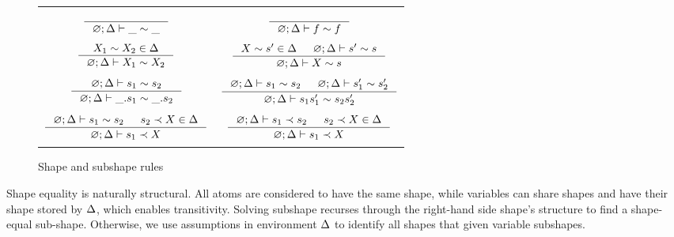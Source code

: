\documentclass[english, mgr]{iithesis}
\newcommand{\solverRule}{\vdash}
\begin{document}
\begin{figure}[htbp]
    \centering
    \begin{tabularx}{\textwidth}{|CC|}
      \hline & \\ $
      \inference{
      }{
        \emptyenv ; \icEnv \solverRule \shatom \csheq \shatom
      }
      $ & $
      \inference{
      }{
        \emptyenv ; \icEnv \solverRule \symb \csheq \symb
      }
      $ \\ & \\
      $
      \inference{
        \termv_1 \csheq \termv_2 \in \icEnv
      }{
        \emptyenv ; \icEnv \solverRule \termv_1 \csheq \termv_2
      }
      $ & $
      \inference{
        \termv  \csheq \shape' \in \icEnv
        &
        \emptyenv ; \icEnv \solverRule \shape'  \csheq \shape
      }{
        \emptyenv ; \icEnv \solverRule \termv  \csheq \shape
      }
      $ \\ & \\
      $\inference{
        \emptyenv ; \icEnv \solverRule \shape_1 \csheq \shape_2
      }{
        \emptyenv ; \icEnv \solverRule \shbind \shape_1 \csheq \shbind \shape_2
      }
      $ & $
      \inference{
        \emptyenv ; \icEnv \solverRule \shape_1 \csheq \shape_2
        &
        \emptyenv ; \icEnv \solverRule \shape_1' \csheq \shape_2'
      }{
        \emptyenv ; \icEnv \solverRule \shape_1 \shape_1' \csheq \shape_2 \shape_2'
      }
      $ \\ & \\ $
      \inference{
        \emptyenv ; \icEnv \solverRule \shape_1 \csheq \shape_2
        &
        \shape_2 \cshlt \termv \in \icEnv
      }{
        \emptyenv ; \icEnv \solverRule \shape_1 \cshlt \termv
      }
      $ & $
      \inference{
        \emptyenv ; \icEnv \solverRule \shape_1 \cshlt \shape_2
        &
        \shape_2 \cshlt \termv \in \icEnv
      }{
        \emptyenv ; \icEnv \solverRule \shape_1 \cshlt \termv
      }
      $ \\ & \\ \hline
      \end{tabularx}
  \caption{Shape and subshape rules}
  \label{fig:shape-rules}
\end{figure}
Shape equality is naturally structural.
All atoms are considered to have the same shape, while
variables can share shapes and have their shape stored by $\Delta$,
which enables transitivity.
Solving subshape recurses through the right-hand side shape's structure to find a shape-equal sub-shape.
Otherwise, we use assumptions in environment $\Delta$ to identify all shapes that given variable subshapes.
\end{document}
